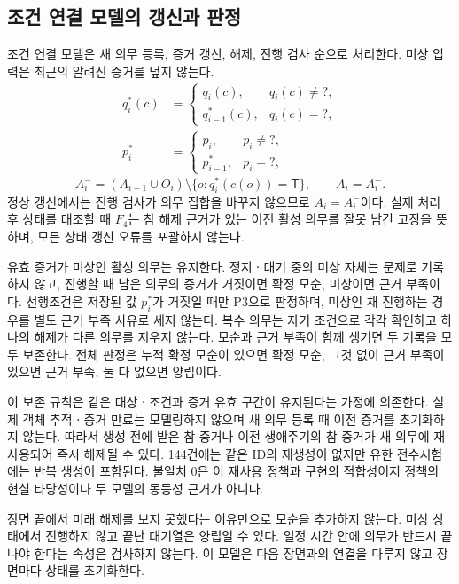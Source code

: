 \begin{revision}
\subsection{조건 연결 모델의 갱신과 판정}
\label{sec:semantics}
조건 연결 모델은 새 의무 등록, 증거 갱신, 해제, 진행 검사 순으로 처리한다. 미상 입력은 최근의 알려진 증거를 덮지 않는다.
\begin{align}
q_i^*(c)&=\begin{cases}q_i(c),&q_i(c)\ne ?,\\q_{i-1}^*(c),&q_i(c)=?,\end{cases}\\
p_i^*&=\begin{cases}p_i,&p_i\ne ?,\\p_{i-1}^*,&p_i=?,\end{cases}
\end{align}
\begin{equation}
A_i^-=(A_{i-1}\cup O_i)\setminus\{o:q_i^*(c(o))=\mathsf{T}\},\qquad A_i=A_i^- .
\label{eq:active-update}
\end{equation}
정상 갱신에서는 진행 검사가 의무 집합을 바꾸지 않으므로 $A_i=A_i^-$이다. 실제 처리 후 상태를 대조할 때 $F_4$는 참 해제 근거가 있는 이전 활성 의무를 잘못 남긴 고장을 뜻하며, 모든 상태 갱신 오류를 포괄하지 않는다.

유효 증거가 미상인 활성 의무는 유지한다. 정지ㆍ대기 중의 미상 자체는 문제로 기록하지 않고, 진행할 때 남은 의무의 증거가 거짓이면 확정 모순, 미상이면 근거 부족이다. 선행조건은 저장된 값 $p_i^*$가 거짓일 때만 P3으로 판정하며, 미상인 채 진행하는 경우를 별도 근거 부족 사유로 세지 않는다. 복수 의무는 자기 조건으로 각각 확인하고 하나의 해제가 다른 의무를 지우지 않는다. 모순과 근거 부족이 함께 생기면 두 기록을 모두 보존한다. 전체 판정은 누적 확정 모순이 있으면 확정 모순, 그것 없이 근거 부족이 있으면 근거 부족, 둘 다 없으면 양립이다.

이 보존 규칙은 같은 대상ㆍ조건과 증거 유효 구간이 유지된다는 가정에 의존한다. 실제 객체 추적ㆍ증거 만료는 모델링하지 않으며 새 의무 등록 때 이전 증거를 초기화하지 않는다. 따라서 생성 전에 받은 참 증거나 이전 생애주기의 참 증거가 새 의무에 재사용되어 즉시 해제될 수 있다. 144건에는 같은 ID의 재생성이 없지만 유한 전수시험에는 반복 생성이 포함된다. 불일치 0은 이 재사용 정책과 구현의 적합성이지 정책의 현실 타당성이나 두 모델의 동등성 근거가 아니다.

장면 끝에서 미래 해제를 보지 못했다는 이유만으로 모순을 추가하지 않는다. 미상 상태에서 진행하지 않고 끝난 대기열은 양립일 수 있다. 일정 시간 안에 의무가 반드시 끝나야 한다는 속성은 검사하지 않는다. 이 모델은 다음 장면과의 연결을 다루지 않고 장면마다 상태를 초기화한다.


\end{revision}
